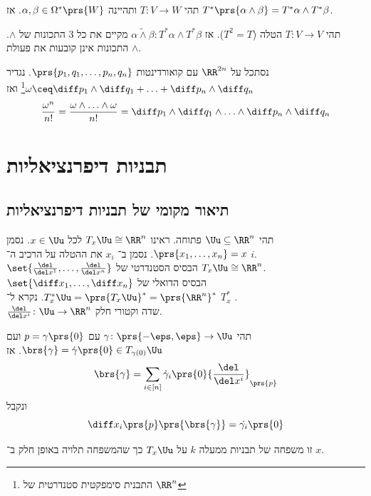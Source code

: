 \documentclass[a4paper,10pt,twoside,openany]{book}
\begin{document}
\begin{exercise}
תהי
$T \colon V \to W$
ותהיינה
$\alpha,\beta \in \Omega^*\prs{W}$.
אז
$T^*\prs{\alpha \wedge \beta} = T^*\alpha \wedge T^* \beta$.
\end{exercise}
\begin{example}
תהי
$T \colon V \to V$
הטלה ($T^2 = T$).
אז
$\alpha \tilde{\wedge} \beta \colon T^* \alpha \wedge T^* \beta$
מקיים את כל
$3$
התכונות של
$\wedge$.
התכונות אינן קובעות את פעולת
$\wedge$.
\end{example}
\begin{exercise}
נסתכל על
$\RR^{2n}$
עם קואורדינטות
$\prs{p_1, q_1, \ldots, p_n,q_n}$.
נגדיר
$\omega \ceq \diff p_1 \wedge \diff q_1+\ldots+ \diff p_n\wedge \diff q_n$\footnote{התבנית סימפקטית סטנדרטית של
$\RR^n$}
ואז
\begin{align*}
\frac{\omega^n}{n!}  = \frac{\omega \wedge \ldots \wedge \omega}{n!} = \diff p_1 \wedge \diff q_1 \wedge \ldots \wedge \diff p_n \wedge \diff q_n
\end{align*}
\end{exercise}

\section{תבניות דיפרנציאליות}
\subsection{תיאור מקומי של תבניות דיפרנציאליות}
\begin{notation}
תהי
$\Uu \subseteq \RR^n$
פתוחה. ראינו
$T_x \Uu \cong \RR^n$
לכל
$x \in \Uu$.
נסמן
$\prs{x_1, \ldots, x_n} = x$.
נסמן ב־%
$x_i$
את ההטלה על הרכיב ה־%
$i$.\\
$\set{\frac{\del}{\del x^1} , \ldots, \frac{\del}{\del x^n}}$
הבסיס הסטנדרטי של
$T_x\Uu \cong \RR^n$.\\
$\set{\diff x_1, \ldots, \diff x_n}$
הבסיס הדואלי של
$T_x^* \Uu = \prs{T_x \Uu}^* = \prs{\RR^n}^*$.
נקרא ל־%
$T_x^*$
.\\
$\frac{\del}{\del x^i} \colon \Uu \to \RR^n$
שדה וקטורי חלק.
\end{notation}

\begin{example}
תהי
$\gamma \colon \prs{-\eps,\eps} \to \Uu$
עם
$p=\gamma\prs{0}$
ועם
$\brs{\gamma} = \dot{\gamma}\prs{0} \in T_{\gamma(0)}\Uu$.
אז
\[\brs{\gamma} = \sum_{i\in[n]} \dot{\gamma}_i\prs{0} {\frac{\del}{\del x^i}}_{\prs{p}}\]
ונקבל
\[\diff x_i \prs{p} \prs{\brs{\gamma}} = \dot{\gamma_i} \prs{0}\]
\end{example}
\begin{definition}
זו משפחה של תבניות ממעלה
$k$
על
$T_x\Uu$
כך שהמשפחה תלויה באופן חלק ב־%
$x$.
\end{definition}
\end{document}

